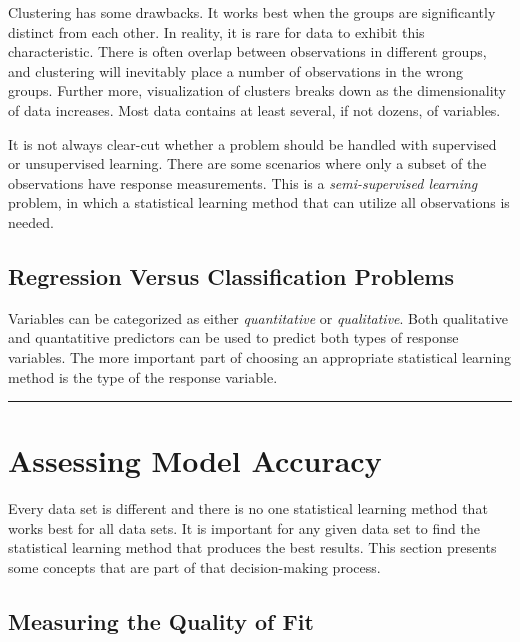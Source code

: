 \documentclass[]{book}
\begin{document}
Clustering has some drawbacks. It works best when the groups are significantly distinct from each other. In reality, it is rare for data to exhibit this characteristic. There is often overlap between observations in different groups, and clustering will inevitably place a number of observations in the wrong groups. Further more, visualization of clusters breaks down as the dimensionality of data increases. Most data contains at least several, if not dozens, of variables.

It is not always clear-cut whether a problem should be handled with supervised or unsupervised learning. There are some scenarios where only a subset of the observations have response measurements. This is a \emph{semi-supervised learning} problem, in which a statistical learning method that can utilize all observations is needed.

\hypertarget{regression-versus-classification-problems}{%
\subsection{Regression Versus Classification Problems}\label{regression-versus-classification-problems}}

Variables can be categorized as either \emph{quantitative} or \emph{qualitative}. Both qualitative and quantatitive predictors can be used to predict both types of response variables. The more important part of choosing an appropriate statistical learning method is the type of the response variable.

\begin{center}\rule{0.5\linewidth}{\linethickness}\end{center}

\hypertarget{assessing-model-accuracy}{%
\section{Assessing Model Accuracy}\label{assessing-model-accuracy}}

Every data set is different and there is no one statistical learning method that works best for all data sets. It is important for any given data set to find the statistical learning method that produces the best results. This section presents some concepts that are part of that decision-making process.

\hypertarget{measuring-the-quality-of-fit}{%
\subsection{Measuring the Quality of Fit}\label{measuring-the-quality-of-fit}}
\end{document}
